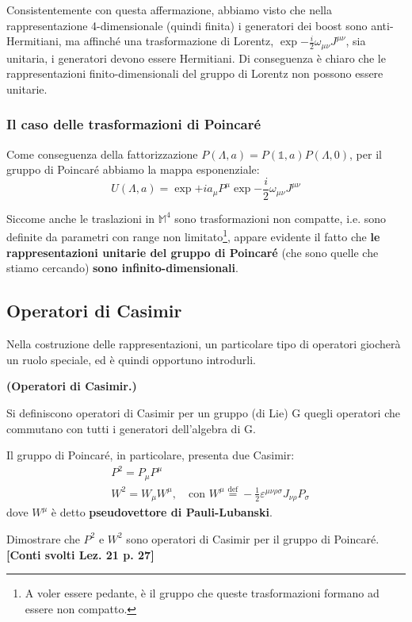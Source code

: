 \documentclass[../main.tex]{subfiles}
\begin{document}
Consistentemente con questa affermazione, abbiamo visto che nella rappresentazione 4-dimensionale (quindi finita) i generatori dei boost sono anti-Hermitiani, ma affinché una trasformazione di Lorentz, \(\exp{-\frac{i}{2}\omega_{\mu\nu}J^{\mu\nu}}\), sia unitaria, i generatori devono essere Hermitiani. Di conseguenza è chiaro che le rappresentazioni finito-dimensionali del gruppo di Lorentz non possono essere unitarie.

\subsubsection{Il caso delle trasformazioni di Poincaré}
Come conseguenza della fattorizzazione \(P(\Lambda, a) = P(\mathbb 1, a)P(\Lambda, 0)\), per il gruppo di Poincaré abbiamo la mappa esponenziale:
\[
\boxed{U(\Lambda, a) = \exp{+ia_\mu P^\mu}\exp{-\frac{i}{2}\omega_{\mu\nu}J^{\mu\nu}}}
\]

Siccome anche le traslazioni in \(\mathbb M^4\) sono trasformazioni non compatte, i.e. sono definite da parametri con range non limitato\footnote{A voler essere pedante, è il gruppo che queste trasformazioni formano ad essere non compatto.}, appare evidente il fatto che \textbf{le rappresentazioni unitarie del gruppo di Poincaré} (che sono quelle che stiamo cercando) \textbf{sono infinito-dimensionali}.  
\subsection{Operatori di Casimir}
Nella costruzione delle rappresentazioni, un particolare tipo di operatori giocherà un ruolo speciale, ed è quindi opportuno introdurli.
\begin{definition}
    \textbf{(Operatori di Casimir.)}

    Si definiscono operatori di Casimir per un gruppo (di Lie) G quegli operatori che commutano con tutti i generatori dell'algebra di G.
\end{definition}

Il gruppo di Poincaré, in particolare, presenta due Casimir:
\[
\boxed{
\begin{aligned}
    &P^2 = P_\mu P^\mu \\
    &W^2 = W_\mu W^\mu, \quad \text{con } W^\mu \overset{\mathrm{def}}{=} -\frac{1}{2}\varepsilon^{\mu\nu\rho\sigma}J_{\nu\rho}P_\sigma
\end{aligned}}
\]
dove $W^\mu$ è detto \textbf{pseudovettore di Pauli-Lubanski}.
\begin{exercise}
    Dimostrare che \(P^2\) e \(W^2\) sono operatori di Casimir per il gruppo di Poincaré. \textbf{[Conti svolti Lez. 21 p. 27]}
    \label{exercise:casimir_verify}
\end{exercise}
\end{document}
